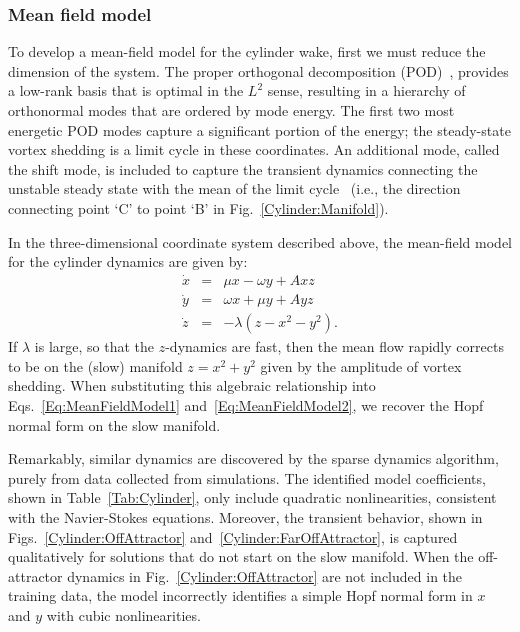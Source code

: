 \documentclass[onecolumn,11pt]{article}
\begin{document}
\subsubsection{Mean field model}
To develop a mean-field model for the cylinder wake, first we must reduce the dimension of the system.  The proper orthogonal decomposition (POD)~\cite{HLBR_turb}, provides a low-rank basis that is optimal in the $L^2$ sense, resulting in a hierarchy of orthonormal modes that are ordered by mode energy.  The first two most energetic POD modes capture a significant portion of the energy; the steady-state vortex shedding is a limit cycle in these coordinates.  An additional mode, called the shift mode, is included to capture the transient dynamics connecting the unstable steady state with the mean of the limit cycle~\cite{Noack2003jfm} (i.e., the direction connecting point `C' to point `B' in Fig.~\ref{Cylinder:Manifold}).  

In the three-dimensional coordinate system described above, the mean-field model for the cylinder dynamics are given by:
\begin{subequations}
\label{Eq:MeanFieldModel}
\begin{eqnarray}
\dot{x} & = & \mu x - \omega y + A xz\label{Eq:MeanFieldModel1}\\
\dot{y} & = & \omega x + \mu y + A yz\label{Eq:MeanFieldModel2}\\
\dot{z} & = & -\lambda(z-x^2-y^2).\label{Eq:MeanFieldModel3}
\end{eqnarray}
\end{subequations}
If $\lambda$ is large, so that the $z$-dynamics are fast, then the mean flow rapidly corrects to be on the (slow) manifold $z=x^2+y^2$ given by the amplitude of vortex shedding.  When substituting this algebraic relationship into Eqs.~\ref{Eq:MeanFieldModel1} and~\ref{Eq:MeanFieldModel2}, we recover the Hopf normal form on the slow manifold.

Remarkably, similar dynamics are discovered by the sparse dynamics algorithm, purely from data collected from simulations.  The identified model coefficients, shown in Table~\ref{Tab:Cylinder}, only include quadratic nonlinearities, consistent with the Navier-Stokes equations.  Moreover, the transient behavior, shown in Figs.~\ref{Cylinder:OffAttractor} and~\ref{Cylinder:FarOffAttractor}, is captured qualitatively for solutions that do not start on the slow manifold.  When the off-attractor dynamics in Fig.~\ref{Cylinder:OffAttractor} are not included in the training data, the model incorrectly identifies a simple Hopf normal form in $x$ and $y$ with cubic nonlinearities.
\end{document}
